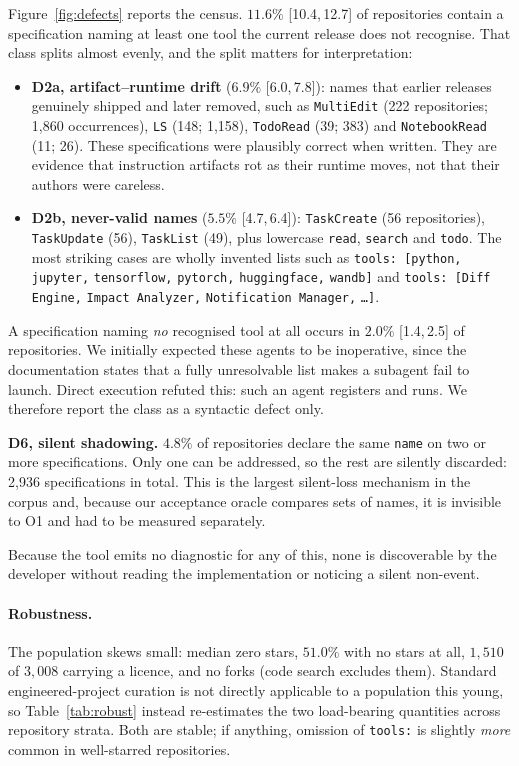 \documentclass[smallextended,natbib]{svjour3}
\newcommand{\code}[1]{\texttt{\small #1}}
\newcommand{\ci}[2]{{\small[#1,\,#2]}}
\begin{document}
Figure~\ref{fig:defects} reports the census. $11.6\%$ \ci{10.4}{12.7} of repositories contain a
specification naming at least one tool the current release does not recognise. That class splits
almost evenly, and the split matters for interpretation:

\begin{itemize}\itemsep2pt
  \item \textbf{D2a, artifact--runtime drift} ($6.9\%$ \ci{6.0}{7.8}): names that earlier releases
        genuinely shipped and later removed, such as \code{MultiEdit} (222 repositories; 1{,}860
        occurrences), \code{LS} (148; 1{,}158), \code{TodoRead} (39; 383) and \code{NotebookRead}
        (11; 26). These specifications were plausibly correct when written. They are evidence that
        instruction artifacts rot as their runtime moves, not that their authors were careless.
  \item \textbf{D2b, never-valid names} ($5.5\%$ \ci{4.7}{6.4}): \code{TaskCreate} (56
        repositories), \code{TaskUpdate} (56), \code{TaskList} (49), plus lowercase \code{read},
        \code{search} and \code{todo}. The most striking cases are wholly invented lists such as
        \code{tools: [python,} \code{jupyter,} \code{tensorflow,} \code{pytorch,} \code{huggingface,}
        \code{wandb]} and \code{tools: [Diff Engine,} \code{Impact Analyzer,} \code{Notification Manager,}
        \code{\ldots]}.
\end{itemize}

A specification naming \emph{no} recognised tool at all occurs in $2.0\%$ \ci{1.4}{2.5} of
repositories. We initially expected these agents to be inoperative, since the documentation states
that a fully unresolvable list makes a subagent fail to launch. Direct execution refuted this: such an
agent registers and runs. We therefore report the class as a syntactic defect only.

\textbf{D6, silent shadowing.} $4.8\%$ of repositories declare the same \code{name} on two or more
specifications. Only one can be addressed, so the rest are silently discarded: 2{,}936 specifications
in total. This is the largest silent-loss mechanism in the corpus and, because our acceptance oracle
compares sets of names, it is invisible to O1 and had to be measured separately.

Because the tool emits no diagnostic for any of this, none is discoverable by the developer without
reading the implementation or noticing a silent non-event.

\paragraph{Robustness.}
\label{sec:robustness}
The population skews small: median zero stars, $51.0\%$ with no stars at all, $1{,}510$ of $3{,}008$
carrying a licence, and no forks (code search excludes them). Standard engineered-project curation
\citep{munaiah2017curating} is not directly applicable to a population this young, so
Table~\ref{tab:robust} instead re-estimates the two load-bearing quantities across repository strata.
Both are stable; if anything, omission of \code{tools:} is slightly \emph{more} common in well-starred
repositories.
\end{document}
